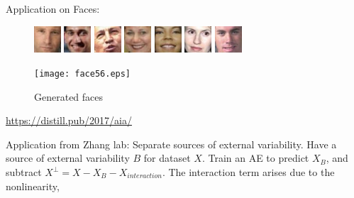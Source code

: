 \documentclass[english]{article}
\begin{document}

\item 

Application on Faces:
\begin{figure}[H]\centering
\includegraphics[width=1cm]{face2.eps}
\includegraphics[width=1cm]{face150.eps}
\includegraphics[width=1cm]{face268.eps}
\includegraphics[width=1cm]{face700.eps}
\includegraphics[width=1cm]{face990.eps}
\includegraphics[width=1cm]{face1004.eps}
\includegraphics[width=1cm]{face1354.eps}
\end{figure}

\begin{figure}[H]\centering
\texttt{[image: face56.eps]}
\caption{Generated faces}
\end{figure}



\url{https://distill.pub/2017/aia/}

\item Application from Zhang lab: Separate sources of external variability. Have a source of external variability $B$ for dataset $X$. Train an AE to predict $X_B$, and subtract $X^\perp = X-X_B-X_{interaction}$. The interaction term arises due to the nonlinearity,  
\end{document}

